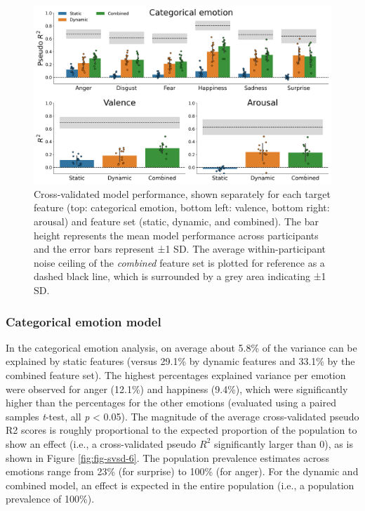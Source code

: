 \documentclass[11pt,american,a4paper,oneside,]{memoir} %
\begin{document}
\begin{figure}
\centering
\includegraphics{_bookdown_files/static-vs-dynamic-files/figures/figure_5.pdf}
\caption{\label{fig:fig-svsd-5}Cross-validated model performance, shown separately for each target feature (top: categorical emotion, bottom left: valence, bottom right: arousal) and feature set (static, dynamic, and combined). The bar height represents the mean model performance across participants and the error bars represent ±1 SD. The average within-participant noise ceiling of the \emph{combined} feature set is plotted for reference as a dashed black line, which is surrounded by a grey area indicating ±1 SD.}
\end{figure}



\hypertarget{categorical-emotion-model}{%
\subsubsection{Categorical emotion model}\label{categorical-emotion-model}}

In the categorical emotion analysis, on average about 5.8\% of the variance can be explained by static features (versus 29.1\% by dynamic features and 33.1\% by the combined feature set). The highest percentages explained variance per emotion were observed for anger (12.1\%) and happiness (9.4\%), which were significantly higher than the percentages for the other emotions (evaluated using a paired samples \emph{t}-test, all \emph{p} \textless{} 0.05). The magnitude of the average cross-validated pseudo R2 scores is roughly proportional to the expected proportion of the population to show an effect (i.e., a cross-validated pseudo \(R^{2}\) significantly larger than 0), as is shown in Figure \ref{fig:fig-svsd-6}. The population prevalence estimates across emotions range from 23\% (for surprise) to 100\% (for anger). For the dynamic and combined model, an effect is expected in the entire population (i.e., a population prevalence of 100\%).
\end{document}
